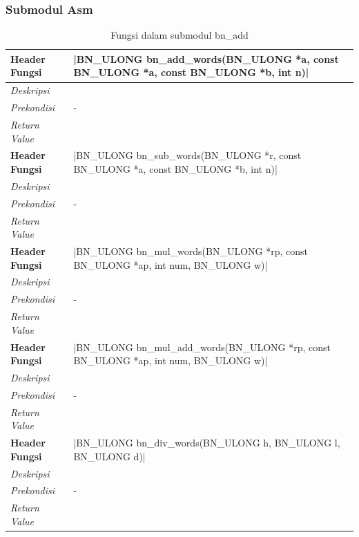 \subsubsection{Submodul Asm}
\begin{table}[h]
  \caption{Fungsi dalam submodul bn\_add}
  \begin{tabular}{R{2.8cm}L{10.5cm}}
    \toprule
    \textbf{Header Fungsi} & |BN_ULONG bn_add_words(BN_ULONG *a, const BN_ULONG *a, const BN_ULONG *b, int n)|  \\ \midrule
    \textit{Deskripsi}     &                                                                                    \\
    \textit{Prekondisi}    & -                                                                                  \\
    \textit{Return Value}  &
    \\ \bottomrule
    \textbf{Header Fungsi} & |BN_ULONG bn_sub_words(BN_ULONG *r, const BN_ULONG *a, const BN_ULONG *b, int n)|  \\ \midrule
    \textit{Deskripsi}     &                                                                                    \\
    \textit{Prekondisi}    & -                                                                                  \\
    \textit{Return Value}  &
    \\ \bottomrule
    \textbf{Header Fungsi} & |BN_ULONG bn_mul_words(BN_ULONG *rp, const BN_ULONG *ap, int num, BN_ULONG w)|     \\ \midrule
    \textit{Deskripsi}     &                                                                                    \\
    \textit{Prekondisi}    & -                                                                                  \\
    \textit{Return Value}  &
    \\ \bottomrule
    \textbf{Header Fungsi} & |BN_ULONG bn_mul_add_words(BN_ULONG *rp, const BN_ULONG *ap, int num, BN_ULONG w)| \\ \midrule
    \textit{Deskripsi}     &                                                                                    \\
    \textit{Prekondisi}    & -                                                                                  \\
    \textit{Return Value}  &
    \\ \bottomrule
    \textbf{Header Fungsi} & |BN_ULONG bn_div_words(BN_ULONG h, BN_ULONG l, BN_ULONG d)|                        \\ \midrule
    \textit{Deskripsi}     &                                                                                    \\
    \textit{Prekondisi}    & -                                                                                  \\
    \textit{Return Value}  &
    \\ \bottomrule
  \end{tabular}

\end{table}
